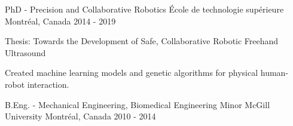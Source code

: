 \begin{cventries}

\cventry
{PhD - Precision and Collaborative Robotics}
{École de technologie supérieure}
{Montréal, Canada}
{2014 - 2019}
{
\begin{cvitems}
\item{Thesis: Towards the Development of Safe, Collaborative Robotic Freehand Ultrasound}
\item{Created machine learning models and genetic algorithms for physical human-robot interaction.}
\end{cvitems}
}

\cventry
{B.Eng. - Mechanical Engineering, Biomedical Engineering Minor}
{McGill University}
{Montréal, Canada}
{2010 - 2014}
{
\begin{cvitems}
\end{cvitems}
}


\end{cventries}
